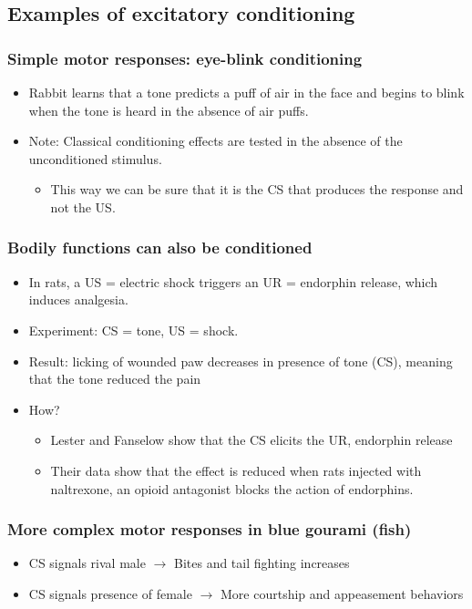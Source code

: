 \subsection{Examples of 
excitatory conditioning}
\subsubsection{Simple motor responses: eye-blink conditioning}
\begin{itemize}
    \item Rabbit learns that a tone predicts a puff of air in the face and begins to blink when the tone is heard in the absence of air puffs.
    \item Note: Classical conditioning effects are tested in the absence of the unconditioned stimulus.
    \begin{itemize}
        \item This way we can be sure that it is the CS that produces the response and not the US.
    \end{itemize}
\end{itemize}

\subsubsection{Bodily functions can also be conditioned}
\begin{itemize}
    \item In rats, a US = electric shock triggers an UR = endorphin release, which induces analgesia. 
    \item Experiment: CS = tone, US = shock.
    \item Result: licking of wounded paw decreases in presence of tone (CS), meaning that the tone reduced the pain
    \item How?
    \begin{itemize}
        \item Lester and Fanselow show that the CS elicits the UR, endorphin release
        \item Their data show that the effect is reduced when rats injected with naltrexone, an opioid antagonist blocks the action of endorphins.
    \end{itemize}
\end{itemize}

\subsubsection{More complex motor responses in blue gourami (fish)
}
\begin{itemize}
    \item CS signals rival male $\rightarrow$ Bites and tail fighting increases
    \item CS signals presence of female $\rightarrow$ More courtship and appeasement behaviors
\end{itemize}


